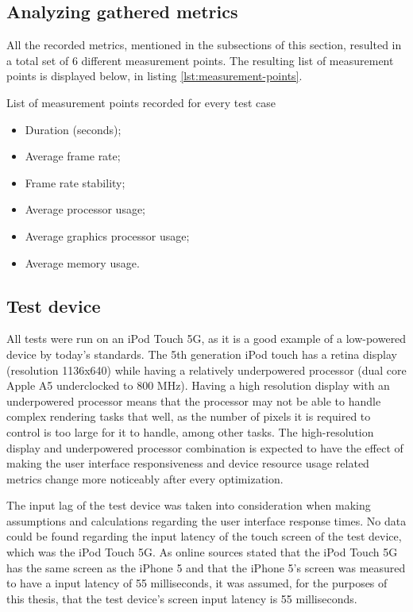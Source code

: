 \documentclass[a4paper,12pt]{article}
\begin{document}
\subsection{Analyzing gathered metrics}
All the recorded metrics, mentioned in the subsections of this section, resulted in a total set of 6 different measurement points. The resulting list of measurement points is displayed below, in listing \autoref{lst:measurement-points}.

\begin{listing}[H]
  \caption{List of measurement points recorded for every test case}
  \label{lst:measurement-points}
  \begin{itemize}
    \item Duration (seconds);
    \item Average frame rate;
    \item Frame rate stability;
    \item Average processor usage;
    \item Average graphics processor usage;
    \item Average memory usage.
  \end{itemize}
\end{listing}

\subsection{Test device}
\label{subsec:test-device}
All tests were run on an iPod Touch 5G, as it is a good example of a low-powered device by today's standards. The 5th generation iPod touch has a retina display (resolution 1136x640)\cite{AppleIPodTouch5G} while having a relatively underpowered \cite{IPhoneVsIPod5} processor (dual core Apple A5 underclocked to 800 MHz)\cite{MacObserverUnderclock}. Having a high resolution display with an underpowered processor means that the processor may not be able to handle complex rendering tasks that well, as the number of pixels it is required to control is too large for it to handle, among other tasks.\cite{RetinaAndWeakProcessor} The high-resolution display and underpowered processor combination is expected to have the effect of making the user interface responsiveness and device resource usage related metrics change more noticeably after every optimization.

The input lag of the test device was taken into consideration when making assumptions and calculations regarding the user interface response times. No data could be found regarding the input latency of the touch screen of the test device, which was the iPod Touch 5G. As online sources stated that the iPod Touch 5G has the same screen as the iPhone 5\cite{Iphone5SameDisplayAs5G} and that the iPhone 5's screen was measured to have a input latency of 55 milliseconds\cite{IPhoneInputLag}, it was assumed, for the purposes of this thesis, that the test device's screen input latency is 55 milliseconds.
\end{document}
